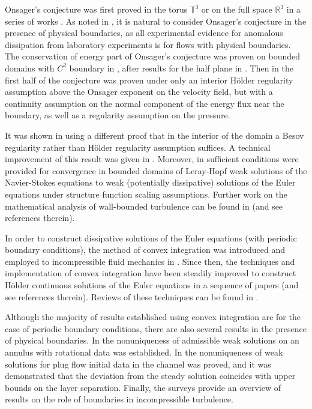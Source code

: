 \documentclass[12pt,a4paper]{article}
\theoremstyle{definition}
\theoremstyle{remark}
\numberwithin{equation}{section}
\begin{document}
Onsager's conjecture was first proved in the torus $\mathbb{T}^3$ or on the full space $\mathbb{R}^3$ in a series of works \cite{eyink,constantin,duchon,cheskidovconstantin,isettproof,buckmasteradmissible}. As noted in \cite{drivas2018}, it is natural to consider Onsager's conjecture in the presence of physical boundaries, as all experimental evidence for anomalous dissipation from laboratory experiments is for flows with physical boundaries. The conservation of energy part of Onsager's conjecture was proven on bounded domains with $C^2$ boundary in \cite{titi2018}, after results for the half plane in \cite{robinson}. Then in \cite{titi2019} the first half of the conjecture was proven under only an interior H\"older regularity assumption above the Onsager exponent on the velocity field, but with a continuity assumption on the normal component of the energy flux near the boundary, as well as a regularity assumption on the pressure.

It was shown in \cite{drivas2018} using a different proof that in the interior of the domain a Besov regularity rather than Hölder regularity assumption suffices. A technical improvement of this result was given in \cite{nguyen}. Moreover, in \cite{drivas2019,constantinremarks,bardosturbulence,bardoseuler} sufficient conditions were provided for convergence in bounded domains of Leray-Hopf weak solutions of the Navier-Stokes equations to weak (potentially dissipative) solutions of the Euler equations under structure function scaling assumptions. Further work on the mathematical analysis of wall-bounded turbulence can be found in \cite{quan,eyinkonsager} (and see references therein). 

In order to construct dissipative solutions of the Euler equations (with periodic boundary conditions), the method of convex integration was introduced and employed to incompressible fluid mechanics in \cite{lellisadmissibility,lellisinclusion}. Since then, the techniques and implementation of convex integration have been steadily improved to construct H\"older continuous solutions of the Euler equations in a sequence of papers \cite{lelliscontinuous,buckmaster,buckmasteradmissible,isettproof,daneri} (and see references therein). Reviews of these techniques can be found in \cite{buckmasterreview,lellis}.

Although the majority of results established using convex integration are for the case of periodic boundary conditions, there are also several results in the presence of physical boundaries. In \cite{bardosnonuniqueness} the nonuniqueness of admissible weak solutions on an annulus with rotational data was established. In \cite{vasseurboundary} the nonuniqueness of weak solutions for plug flow initial data in the channel was proved, and it was demonstrated that the deviation from the steady solution coincides with upper bounds on the layer separation. Finally, the surveys \cite{bardosturbulence,bardoseuler,eyinkreview} provide an overview of results on the role of boundaries in incompressible turbulence. 
\end{document}
